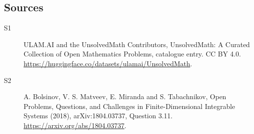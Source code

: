 \documentclass[11pt]{article}
\begin{document}
\subsection{Sources}
\begin{description}
\item[\hypertarget{source:statement:1}{S1}] ULAM.AI and the UnsolvedMath Contributors, UnsolvedMath: A Curated Collection of Open Mathematics Problems, catalogue entry. CC BY 4.0. \url{https://huggingface.co/datasets/ulamai/UnsolvedMath}.
\item[\hypertarget{source:statement:2}{S2}] A. Bolsinov, V. S. Matveev, E. Miranda and S. Tabachnikov, Open Problems, Questions, and Challenges in Finite-Dimensional Integrable Systems (2018), arXiv:1804.03737, Question 3.11. \url{https://arxiv.org/abs/1804.03737}.
\end{description}
\label{end:statement}
\end{document}
